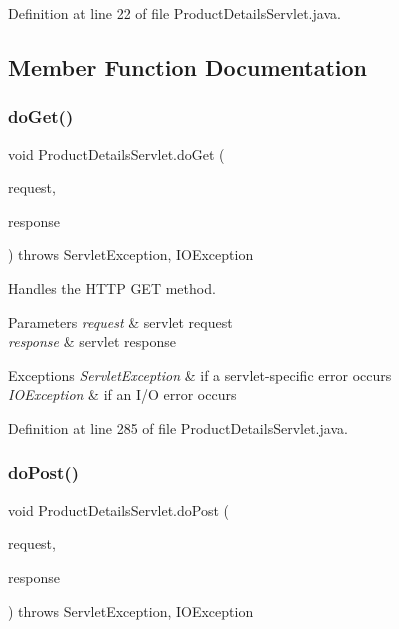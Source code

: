 Definition at line 22 of file Product\+Details\+Servlet.\+java.



\subsection{Member Function Documentation}
\mbox{\label{class_product_details_servlet_a802fc18615a1ded87cce7a4a821e179f}} 
\subsubsection{\texorpdfstring{doGet()}{doGet()}}
{\footnotesize\ttfamily void Product\+Details\+Servlet.\+do\+Get (\begin{DoxyParamCaption}\item[{Http\+Servlet\+Request}]{request,  }\item[{Http\+Servlet\+Response}]{response }\end{DoxyParamCaption}) throws Servlet\+Exception, I\+O\+Exception\hspace{0.3cm}{\ttfamily [protected]}}

Handles the H\+T\+TP {\ttfamily G\+ET} method.


\begin{DoxyParams}{Parameters}
{\em request} & servlet request \\
\hline
{\em response} & servlet response \\
\hline
\end{DoxyParams}

\begin{DoxyExceptions}{Exceptions}
{\em Servlet\+Exception} & if a servlet-\/specific error occurs \\
\hline
{\em I\+O\+Exception} & if an I/O error occurs \\
\hline
\end{DoxyExceptions}


Definition at line 285 of file Product\+Details\+Servlet.\+java.

\mbox{\label{class_product_details_servlet_a27e8e3ffb9bd8315e0a9f5c459fb789d}} 
\subsubsection{\texorpdfstring{doPost()}{doPost()}}
{\footnotesize\ttfamily void Product\+Details\+Servlet.\+do\+Post (\begin{DoxyParamCaption}\item[{Http\+Servlet\+Request}]{request,  }\item[{Http\+Servlet\+Response}]{response }\end{DoxyParamCaption}) throws Servlet\+Exception, I\+O\+Exception\hspace{0.3cm}{\ttfamily [protected]}}

